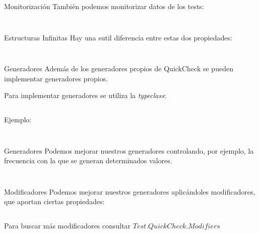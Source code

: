 \documentclass[10pt]{beamer}
\newcommand\Fontvi{\fontsize{10}{12}\selectfont}
\begin{document}
\begin{frame}[standout]
  \Fontvi
  \inputminted{text}{data/pruebas_max_prop.txt}
\end{frame}

\begin{frame}{Monitorización}
  También podemos monitorizar datos de los tests:
  \inputminted{haskell}{data/monitor_test.hs}
\end{frame}

\begin{frame}[standout]
  \Fontvi
  \inputminted{text}{data/monitor_test_pruebas.txt}
\end{frame}

\begin{frame}{Estructuras Infinitas}
  Hay una sutil diferencia entre estas dos propiedades:
  \inputminted{haskell}{data/infinite.hs}
\end{frame}

\begin{frame}[standout]
  \Fontvi
  \inputminted{text}{data/infinite_prueba.txt}
\end{frame}

\begin{frame}{Generadores}
  Además de los generadores propios de QuickCheck se pueden
  implementar generadores propios.

  Para implementar generadores se
  utiliza la \textit{typeclass}:
  \inputminted{haskell}{data/arbitrary.hs}

  Ejemplo:
  \inputminted{haskell}{data/colours.hs}
\end{frame}

\begin{frame}[standout]
  \Fontvi
  \inputminted{text}{data/colours_prueba.txt}
\end{frame}

\begin{frame}{Generadores}
  Podemos mejorar nuestros generadores controlando, por ejemplo, la
  frecuencia con la que se generan determinados valores.

  \inputminted{haskell}{data/colours1.hs}
\end{frame}

\begin{frame}[standout]
  \Fontvi
  \inputminted{text}{data/colours1_prueba.txt}
\end{frame}

\begin{frame}{Modificadores}    %
  Podemos mejorar nuestros generadores aplicándoles modificadores, que
  aportan ciertas propiedades:

  \inputminted{haskell}{data/modificadores.hs}

  Para buscar más modificadores consultar $Test.QuickCheck.Modifiers$
\end{frame}
\end{document}
